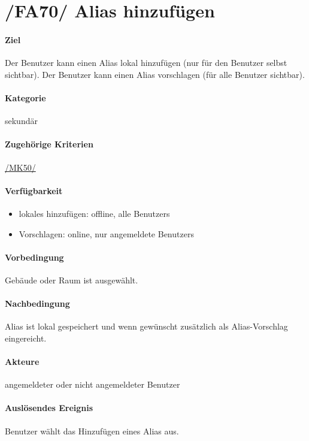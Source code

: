 \section[Alias hinzufügen]{/FA70/ Alias hinzufügen}
\label{/FA70/}
\paragraph{Ziel}
Der \Gls{Benutzer} kann einen \Gls{Alias} \gls{lokal} hinzufügen (nur für den \Gls{Benutzer} selbst sichtbar). Der \Gls{Benutzer} kann einen \Gls{Alias} vorschlagen (für alle \Gls{Benutzer} sichtbar).
\paragraph{Kategorie}
sekundär
\paragraph{Zugehörige Kriterien}
\hyperref[/MK50/]{/MK50/}
\paragraph{Verfügbarkeit}
\begin{itemize}
    \item \Gls{lokal}es hinzufügen: \gls{offline}, alle \Glspl{Benutzer}
    \item Vorschlagen: online, nur angemeldete \Glspl{Benutzer}
\end{itemize}

\paragraph{Vorbedingung}
Gebäude oder Raum ist ausgewählt.
\paragraph{Nachbedingung}
\Gls{Alias} ist \gls{lokal} gespeichert und wenn gewünscht zusätzlich als \Gls{Alias-Vorschlag} eingereicht.
\paragraph{Akteure}
angemeldeter oder nicht angemeldeter \Gls{Benutzer}
\paragraph{Auslösendes Ereignis}
\Gls{Benutzer} wählt das Hinzufügen eines \Gls{Alias} aus.
